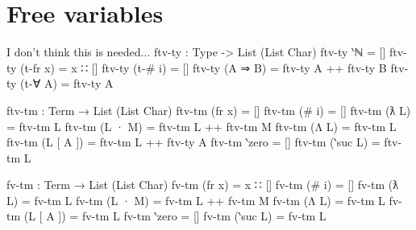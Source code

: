 \documentclass[logo,bsc,singlespacing,parskip,online]{infthesis}
\renewenvironment{code}{\mintedcopy[breaklines,breaksymbolleft=\;]{agda}}{\endmintedcopy}
\begin{document}
\section{Free variables}
I don't think this is needed...
\begin{code}
  ftv-ty : Type -> List (List Char)
  ftv-ty ‵ℕ = []
  ftv-ty (t-fr x) = x ∷ []
  ftv-ty (t-# i) = []
  ftv-ty (A ⇒ B) = ftv-ty A ++ ftv-ty B
  ftv-ty (t-∀ A) = ftv-ty A

  ftv-tm : Term → List (List Char)
  ftv-tm (fr x) = []
  ftv-tm (# i) = []
  ftv-tm (ƛ L) = ftv-tm L
  ftv-tm (L · M) = ftv-tm L ++ ftv-tm M
  ftv-tm (Λ L) = ftv-tm L
  ftv-tm (L [ A ]) = ftv-tm L ++ ftv-ty A
  ftv-tm ‵zero = []
  ftv-tm (‵suc L) = ftv-tm L

  fv-tm : Term → List (List Char)
  fv-tm (fr x) = x ∷ []
  fv-tm (# i) = []
  fv-tm (ƛ L) = fv-tm L
  fv-tm (L · M) = fv-tm L ++ fv-tm M
  fv-tm (Λ L) = fv-tm L
  fv-tm (L [ A ]) = fv-tm L
  fv-tm ‵zero = []
  fv-tm (‵suc L) = fv-tm L
\end{code}
\end{document}
